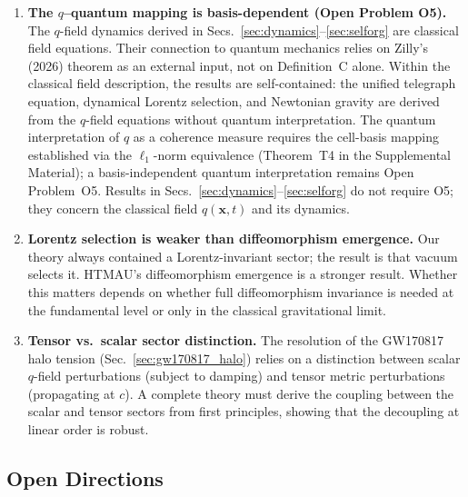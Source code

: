 \documentclass[aps,prd,twocolumn,showpacs,superscriptaddress,preprintnumbers]{revtex4-2}
\begin{document}
\begin{enumerate}
    \item \textbf{The $q$--quantum mapping is basis-dependent (Open Problem O5).}
    The $q$-field dynamics derived in Secs.~\ref{sec:dynamics}--\ref{sec:selforg} are classical field equations.
    Their connection to quantum mechanics relies on Zilly's (2026) theorem as an external input, not on Definition~C alone.
    Within the classical field description, the results are self-contained: the unified telegraph equation, dynamical Lorentz selection, and Newtonian gravity are derived from the $q$-field equations without quantum interpretation.
    The quantum interpretation of $q$ as a coherence measure requires the cell-basis mapping established via the $\ell_1$-norm equivalence (Theorem~T4 in the Supplemental Material); a basis-independent quantum interpretation remains Open Problem~O5.
    Results in Secs.~\ref{sec:dynamics}--\ref{sec:selforg} do not require O5; they concern the classical field $q(\mathbf{x},t)$ and its dynamics.

    \item \textbf{Lorentz selection is weaker than diffeomorphism emergence.} Our theory always contained a Lorentz-invariant sector; the result is that vacuum selects it. HTMAU's diffeomorphism emergence is a stronger result. Whether this matters depends on whether full diffeomorphism invariance is needed at the fundamental level or only in the classical gravitational limit.

    \item \textbf{Tensor vs.\ scalar sector distinction.} The resolution of the GW170817 halo tension (Sec.~\ref{sec:gw170817_halo}) relies on a distinction between scalar $q$-field perturbations (subject to damping) and tensor metric perturbations (propagating at $c$). A complete theory must derive the coupling between the scalar and tensor sectors from first principles, showing that the decoupling at linear order is robust.
\end{enumerate}

\subsection{Open Directions}
\end{document}
